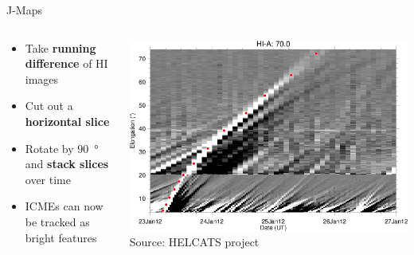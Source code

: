 \documentclass[10pt,aspectratio=169,usenames,dvipsnames]{beamer}
\begin{document}
\begin{frame}{J-Maps}
    \begin{columns}
        \begin{column}{0.35\textwidth}
            \begin{itemize}
                \item Take \textbf{running difference} of HI images
                \item Cut out a \textbf{horizontal slice}
                \item Rotate by \SI{90}{\degree} and \textbf{stack slices} over time
                \item ICMEs can now be tracked as bright features
            \end{itemize}
        \end{column}
        \begin{column}{0.65\textwidth}
            \includegraphics[width=\textwidth]{images/HCME_A__20120123_01.png}
            \small Source: HELCATS project
        \end{column}
    \end{columns}
\end{frame}
\end{document}
